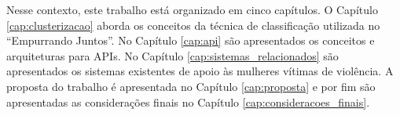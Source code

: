 

Nesse contexto, este trabalho está organizado em cinco capítulos. O Capítulo \ref{cap:clusterizacao} aborda os conceitos da técnica de 
classificação utilizada no ``Empurrando Juntos''. No Capítulo \ref{cap:api} são apresentados os conceitos e arquiteturas para APIs.
No Capítulo \ref{cap:sistemas_relacionados} são apresentados os sistemas existentes de apoio às mulheres vítimas de violência. A proposta do trabalho
é apresentada no Capítulo \ref{cap:proposta} e por fim são apresentadas as considerações finais no Capítulo \ref{cap:consideracoes_finais}.




